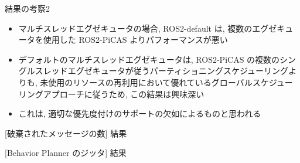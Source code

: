 \begin{frame}{結果の考察2}
    \begin{itemize}
        \item マルチスレッドエグゼキュータの場合, ROS2-default は, 複数のエグゼキュータを使用した ROS2-PiCAS よりパフォーマンスが悪い
        \item デフォルトのマルチスレッドエグゼキュータは, ROS2-PiCAS の複数のシングルスレッドエグゼキュータが従うパーティショニングスケジューリングよりも, 未使用のリソースの再利用において優れているグローバルスケジューリングアプローチに従うため, この結果は興味深い
        \item これは, 適切な優先度付けのサポートの欠如によるものと思われる
    \end{itemize}
\end{frame}

\begin{frame}{[破棄されたメッセージの数] 結果}
\end{frame}

\begin{frame}{[Behavior Planner のジッタ] 結果}
\end{frame}

